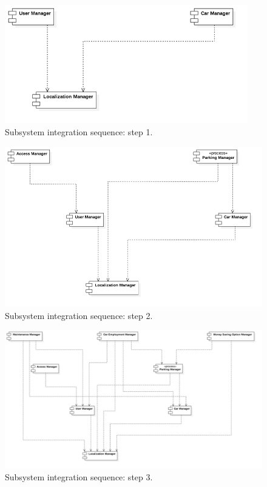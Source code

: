 			\begin{figure}[h]
				\includegraphics[width=300pt,center]{img/integration_strategy/steps/high_level_components_lv1.png}
				\caption{Subsystem integration sequence: step 1.}
			\end{figure}
		\FloatBarrier

			\begin{figure}[h]
				\includegraphics[width=400pt,center]{img/integration_strategy/steps/high_level_components_lv2.png}
				\caption{Subsystem integration sequence: step 2.}
			\end{figure}
		\FloatBarrier

			\begin{figure}[h]
				\includegraphics[width=\textwidth,center]{img/integration_strategy/steps/high_level_components_lv3.png}
				\caption{Subsystem integration sequence: step 3.}
			\end{figure}
		\FloatBarrier

